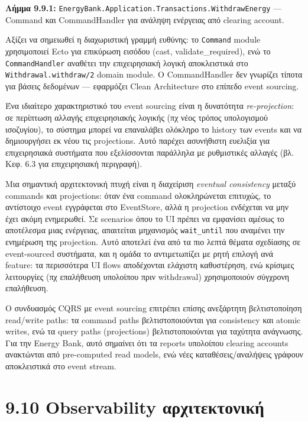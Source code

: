 \textbf{Λήμμα 9.9.1:}
\texttt{EnergyBank.Application.Transactions.WithdrawEnergy} --- Command
και CommandHandler για ανάληψη ενέργειας από clearing account.

Αξίζει να σημειωθεί η διαχωριστική γραμμή ευθύνης: το \texttt{Command}
module χρησιμοποιεί Ecto για επικύρωση εισόδου (cast,
validate\_required), ενώ το \texttt{CommandHandler} αναθέτει την
επιχειρησιακή λογική αποκλειστικά στο \texttt{Withdrawal.withdraw/2}
domain module. Ο CommandHandler δεν γνωρίζει τίποτα για βάσεις δεδομένων
--- εφαρμόζει Clean Architecture στο επίπεδο event sourcing.

Ένα ιδιαίτερο χαρακτηριστικό του event sourcing είναι η δυνατότητα
\emph{re-projection}: σε περίπτωση αλλαγής επιχειρησιακής λογικής (πχ
νέος τρόπος υπολογισμού ισοζυγίου), το σύστημα μπορεί να επαναλάβει
ολόκληρο το history των events και να δημιουργήσει εκ νέου τις
projections. Αυτό παρέχει ασυνήθιστη ευελιξία για επιχειρησιακά
συστήματα που εξελίσσονται παράλληλα με ρυθμιστικές αλλαγές (βλ. Κεφ.
6.3 για επιχειρησιακή περιγραφή).

Μια σημαντική αρχιτεκτονική πτυχή είναι η διαχείριση \emph{eventual
consistency} μεταξύ commands και projections: όταν ένα command
ολοκληρώνεται επιτυχώς, το αντίστοιχο event εγγράφεται στο EventStore,
αλλά η projection ενδέχεται να μην έχει ακόμη ενημερωθεί. Σε scenarios
όπου το UI πρέπει να εμφανίσει αμέσως το αποτέλεσμα μιας ενέργειας,
απαιτείται μηχανισμός \texttt{wait\_until} που αναμένει την ενημέρωση
της projection. Αυτό αποτελεί ένα από τα πιο λεπτά θέματα σχεδίασης σε
event-sourced συστήματα, και η ομάδα το αντιμετωπίζει με ρητή επιλογή
ανά feature: τα περισσότερα UI flows αποδέχονται ελάχιστη καθυστέρηση,
ενώ κρίσιμες λειτουργίες (πχ επαλήθευση υπολοίπου πριν withdrawal)
χρησιμοποιούν σύγχρονη επαλήθευση.

Ο συνδυασμός CQRS με event sourcing επιτρέπει επίσης ανεξάρτητη
βελτιστοποίηση read/write paths: τα command paths βελτιστοποιούνται για
consistency και atomic writes, ενώ τα query paths (projections)
βελτιστοποιούνται για ταχύτητα ανάγνωσης. Για την Energy Bank, αυτό
σημαίνει ότι τα reports υπολοίπου clearing accounts ανακτώνται από
pre-computed read models, ενώ νέες καταθέσεις/αναλήψεις γράφουν
αποκλειστικά στο event stream.

\section{9.10 Observability
αρχιτεκτονική}\label{observability-ux3b1ux3c1ux3c7ux3b9ux3c4ux3b5ux3baux3c4ux3bfux3bdux3b9ux3baux3ae}

